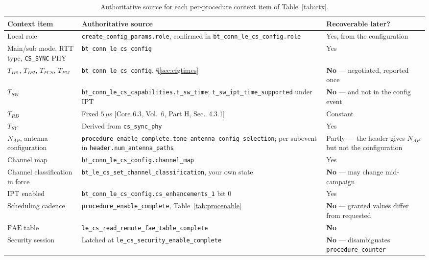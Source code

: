 \documentclass[11pt,a4paper]{article}
\newcommand{\us}{\,\ensuremath{\upmu}s}
\newcommand{\code}[1]{\texttt{\small #1}}
\newcommand{\FAE}{\ensuremath{\mathrm{FAE}}}
\newcommand{\IPT}{\ensuremath{\mathrm{IPT}}}
\newcommand{\Nap}{\ensuremath{N_{AP}}}
\providecommand{\upmu}{\mu}
\newcommand{\core}[1]{\textcolor{rulegrey}{\small[Core 6.3, #1]}}
\newcommand{\Tsy}{\ensuremath{T_{SY}}}
\newcommand{\Trd}{\ensuremath{T_{RD}}}
\newcommand{\Tpm}{\ensuremath{T_{PM}}}
\newcommand{\Tsw}{\ensuremath{T_{SW}}}
\begin{document}
\begin{table}[htb]
\caption{Authoritative source for each per-procedure context item of Table~\ref{tab:ctx}.}
\label{tab:latch}
\centering\scriptsize
\begin{tabular}{@{}L{40mm}L{54mm}L{42mm}@{}}
\toprule
Context item & Authoritative source & Recoverable later? \\
\midrule
Local role & \code{create\_\allowbreak{}config\_\allowbreak{}params.role}, confirmed in \code{bt\_\allowbreak{}conn\_\allowbreak{}le\_\allowbreak{}cs\_\allowbreak{}config.role} & Yes, from the configuration \\
Main/sub mode, RTT type, \code{CS\_\allowbreak{}SYNC} PHY & \code{bt\_\allowbreak{}conn\_\allowbreak{}le\_\allowbreak{}cs\_\allowbreak{}config} & Yes \\
$T_{IP1}$, $T_{IP2}$, $T_{FCS}$, \Tpm & \code{bt\_\allowbreak{}conn\_\allowbreak{}le\_\allowbreak{}cs\_\allowbreak{}config}, \S\ref{sec:cfgtimes} & \textbf{No} --- negotiated, reported once \\
\Tsw & \code{bt\_\allowbreak{}conn\_\allowbreak{}le\_\allowbreak{}cs\_\allowbreak{}capabilities.t\_\allowbreak{}sw\_\allowbreak{}time}; \code{t\_\allowbreak{}sw\_\allowbreak{}ipt\_\allowbreak{}time\_\allowbreak{}supported} under \IPT & \textbf{No} --- and not in the config event \\
\Trd & Fixed $5$\us{} \core{Vol.\ 6, Part H, Sec.\ 4.3.1} & Constant \\
\Tsy & Derived from \code{cs\_\allowbreak{}sync\_\allowbreak{}phy} & Yes \\
$\Nap$, antenna configuration & \code{procedure\_\allowbreak{}enable\_\allowbreak{}complete.tone\_\allowbreak{}antenna\_\allowbreak{}config\_\allowbreak{}selection}; per subevent in \code{header.num\_\allowbreak{}antenna\_\allowbreak{}paths} & Partly --- the header gives $\Nap$ but not the configuration \\
Channel map & \code{bt\_\allowbreak{}conn\_\allowbreak{}le\_\allowbreak{}cs\_\allowbreak{}config.channel\_\allowbreak{}map} & Yes \\
Channel classification in force & \code{bt\_\allowbreak{}le\_\allowbreak{}cs\_\allowbreak{}set\_\allowbreak{}channel\_\allowbreak{}classification}, your own state & \textbf{No} --- may change mid-campaign \\
\IPT{} enabled & \code{bt\_\allowbreak{}conn\_\allowbreak{}le\_\allowbreak{}cs\_\allowbreak{}config.cs\_\allowbreak{}enhancements\_\allowbreak{}1} bit 0 & Yes \\
Scheduling cadence & \code{procedure\_\allowbreak{}enable\_\allowbreak{}complete}, Table~\ref{tab:procenable} & \textbf{No} --- granted values differ from requested \\
$\FAE$ table & \code{le\_\allowbreak{}cs\_\allowbreak{}read\_\allowbreak{}remote\_\allowbreak{}fae\_\allowbreak{}table\_\allowbreak{}complete} & \textbf{No} \\
Security session & Latched at \code{le\_\allowbreak{}cs\_\allowbreak{}security\_\allowbreak{}enable\_\allowbreak{}complete} & \textbf{No} --- disambiguates \code{procedure\_\allowbreak{}counter} \\
\bottomrule
\end{tabular}
\end{table}
\end{document}
